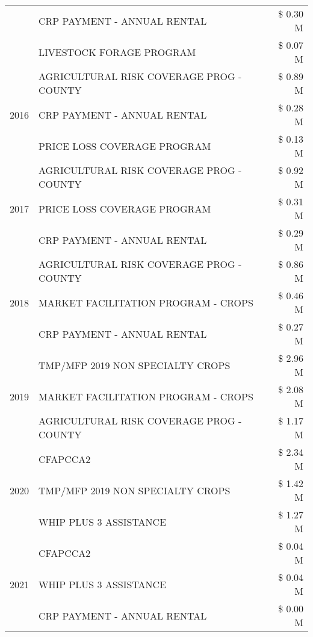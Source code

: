 \begin{tabular}{llr}
 & CRP PAYMENT - ANNUAL RENTAL & \$ 0.30 M \\
 & LIVESTOCK FORAGE PROGRAM & \$ 0.07 M \\
\cline{1-3}
\multirow[t]{3}{*}{2016} & AGRICULTURAL RISK COVERAGE PROG - COUNTY & \$ 0.89 M \\
 & CRP PAYMENT - ANNUAL RENTAL & \$ 0.28 M \\
 & PRICE LOSS COVERAGE PROGRAM & \$ 0.13 M \\
\cline{1-3}
\multirow[t]{3}{*}{2017} & AGRICULTURAL RISK COVERAGE PROG - COUNTY & \$ 0.92 M \\
 & PRICE LOSS COVERAGE PROGRAM & \$ 0.31 M \\
 & CRP PAYMENT - ANNUAL RENTAL & \$ 0.29 M \\
\cline{1-3}
\multirow[t]{3}{*}{2018} & AGRICULTURAL RISK COVERAGE PROG - COUNTY & \$ 0.86 M \\
 & MARKET FACILITATION PROGRAM - CROPS & \$ 0.46 M \\
 & CRP PAYMENT - ANNUAL RENTAL & \$ 0.27 M \\
\cline{1-3}
\multirow[t]{3}{*}{2019} & TMP/MFP 2019 NON SPECIALTY CROPS & \$ 2.96 M \\
 & MARKET FACILITATION PROGRAM - CROPS & \$ 2.08 M \\
 & AGRICULTURAL RISK COVERAGE PROG - COUNTY & \$ 1.17 M \\
\cline{1-3}
\multirow[t]{3}{*}{2020} & CFAPCCA2 & \$ 2.34 M \\
 & TMP/MFP 2019 NON SPECIALTY CROPS & \$ 1.42 M \\
 & WHIP PLUS 3 ASSISTANCE & \$ 1.27 M \\
\cline{1-3}
\multirow[t]{3}{*}{2021} & CFAPCCA2 & \$ 0.04 M \\
 & WHIP PLUS 3 ASSISTANCE & \$ 0.04 M \\
 & CRP PAYMENT - ANNUAL RENTAL & \$ 0.00 M \\
\cline{1-3}
\bottomrule
\end{tabular}
